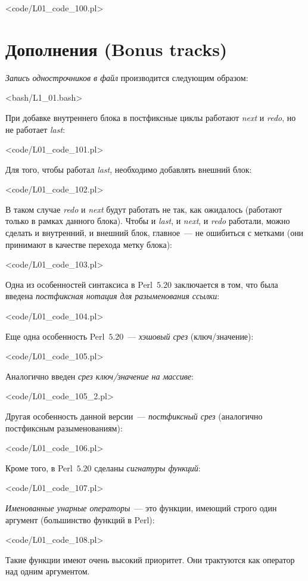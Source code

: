 \pr<code/L01_code_100.pl>

\renewcommand{\lasttiming}{6772}
\section{Дополнения (Bonus tracks)} %

\textit{Запись однострочников в файл} производится следующим образом:

\pr<bash/L1_01.bash>


При добавке внутреннего блока в постфиксные циклы работают \textit{next} и \textit{redo}, но не работает \textit{last}:

\pr<code/L01_code_101.pl>

Для того, чтобы работал \textit{last}, необходимо добавлять внешний блок:

\pr<code/L01_code_102.pl>

В таком случае \textit{redo} и \textit{next} будут работать не так, как ожидалось (работают только в рамках данного блока).
Чтобы и \textit{last}, и \textit{next}, и \textit{redo} работали, можно сделать и внутренний, и внешний блок, главное~--- не ошибиться с метками (они принимают в качестве перехода метку блока):

\pr<code/L01_code_103.pl>

Одна из особенностей синтаксиса в Perl~$5.20$ заключается в том, что была введена \textit{постфиксная нотация для разыменования ссылки}:

\pr<code/L01_code_104.pl>

Еще одна особенность Perl~$5.20$~--- \textit{хэшовый срез} (ключ/значение):

\pr<code/L01_code_105.pl>

Аналогично введен \textit{срез ключ/значение на массиве}:

\pr<code/L01_code_105_2.pl>


Другая особенность данной версии~--- \textit{постфиксный срез} (аналогично постфиксным разыменованиям):

\pr<code/L01_code_106.pl>

Кроме того, в Perl~$5.20$ сделаны \textit{сигнатуры функций}:

\pr<code/L01_code_107.pl>

\textit{Именованные унарные операторы}~--- это функции, имеющий строго один аргумент (большинство функций в Perl):

\pr<code/L01_code_108.pl>

Такие функции имеют очень высокий приоритет.
Они трактуются как оператор над одним аргументом.
